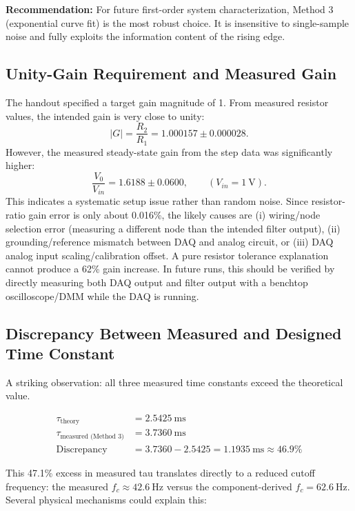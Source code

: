\documentclass[11pt]{article}
\begin{document}
\textbf{Recommendation:} For future first-order system characterization, Method 3 (exponential curve fit) is the most robust choice. It is insensitive to single-sample noise and fully exploits the information content of the rising edge.

\subsection{Unity-Gain Requirement and Measured Gain}

The handout specified a target gain magnitude of 1. From measured resistor values, the intended gain is very close to unity:
\[ |G| = \frac{R_2}{R_1} = 1.000157 \pm 0.000028. \]
However, the measured steady-state gain from the step data was significantly higher:
\[ \frac{V_0}{V_{in}} = 1.6188 \pm 0.0600, \qquad (V_{in}=\SI{1}{\volt}). \]
This indicates a systematic setup issue rather than random noise. Since resistor-ratio gain error is only about 0.016\%, the likely causes are (i) wiring/node selection error (measuring a different node than the intended filter output), (ii) grounding/reference mismatch between DAQ and analog circuit, or (iii) DAQ analog input scaling/calibration offset. A pure resistor tolerance explanation cannot produce a 62\% gain increase. In future runs, this should be verified by directly measuring both DAQ output and filter output with a benchtop oscilloscope/DMM while the DAQ is running.

\subsection{Discrepancy Between Measured and Designed Time Constant}

A striking observation: all three measured time constants exceed the theoretical value.

\begin{align*}
  \tau_{\text{theory}} &= \SI{2.5425}{\milli\second} \\
  \tau_{\text{measured (Method 3)}} &= \SI{3.7360}{\milli\second} \\
  \text{Discrepancy} &= 3.7360 - 2.5425 = \SI{1.1935}{\milli\second} \approx 46.9\%
\end{align*}

This 47.1\% excess in measured tau translates directly to a reduced cutoff frequency: the measured $f_c \approx \SI{42.6}{\hertz}$ versus the component-derived $f_c = \SI{62.6}{\hertz}$. Several physical mechanisms could explain this:
\end{document}
